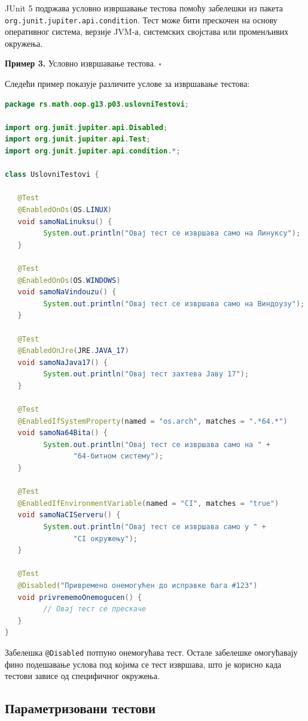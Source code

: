 JUnit 5 подржава условно извршавање тестова помоћу забелешки из пакета \texttt{org.junit.jupiter.api.condition}. Тест може бити прескочен на основу оперативног система, верзије JVM-а, системских својстава или променљивих окружења.


\bigskip

\noindent \textbf{Пример 3.} Условно извршавање тестова. $\square$

\medskip

Следећи пример показује различите услове за извршавање тестова:


\begin{lstlisting}[language=Java]
package rs.math.oop.g13.p03.uslovniTestovi;
 
import org.junit.jupiter.api.Disabled;
import org.junit.jupiter.api.Test;
import org.junit.jupiter.api.condition.*;
 
class UslovniTestovi {
 
   @Test
   @EnabledOnOs(OS.LINUX)
   void samoNaLinuksu() {
         System.out.println("Овај тест се извршава само на Линуксу");
   }
 
   @Test
   @EnabledOnOs(OS.WINDOWS)
   void samoNaVindouzu() {
         System.out.println("Овај тест се извршава само на Виндоузу");
   }
 
   @Test
   @EnabledOnJre(JRE.JAVA_17)
   void samoNaJava17() {
         System.out.println("Овај тест захтева Јаву 17");
   }
 
   @Test
   @EnabledIfSystemProperty(named = "os.arch", matches = ".*64.*")
   void samoNa64Bita() {
         System.out.println("Овај тест се извршава само на " +
                "64-битном систему");
   }
 
   @Test
   @EnabledIfEnvironmentVariable(named = "CI", matches = "true")
   void samoNaCIServeru() {
         System.out.println("Овај тест се извршава само у " +
                "CI окружењу");
   }
 
   @Test
   @Disabled("Привремено онемогућен до исправке бага #123")
   void privrememoOnemogucen() {
         // Овај тест се прескаче
   }
}
\end{lstlisting}


Забелешка \texttt{@Disabled} потпуно онемогућава тест. Остале забелешке омогућавају фино подешавање услова под којима се тест извршава, што је корисно када тестови зависе од специфичног окружења.


\subsection{Параметризовани тестови}

